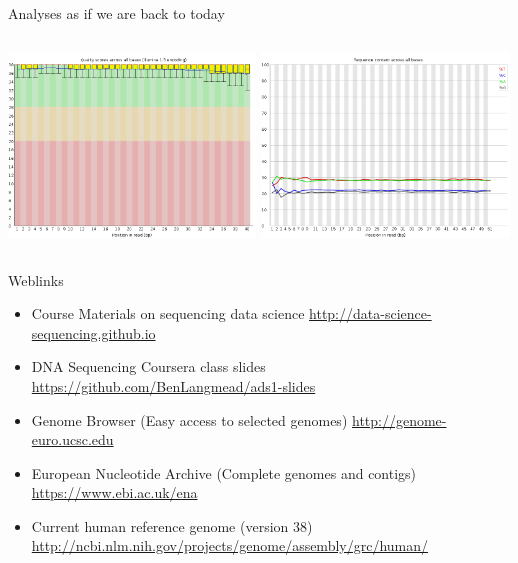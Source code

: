 \documentclass[10pt]{beamer}
\begin{document}
\begin{frame}{Analyses as if we are back to today}
	\begin{columns}[T]
		\column{\dimexpr\paperwidth-10pt}
		\includegraphics[width=0.493\textwidth]{./figures/fastqc-good.png}
		\includegraphics[width=0.493\textwidth]{./figures/fastqc-good2.png}
	\end{columns}
\end{frame}

\begin{frame}{Weblinks}
	\begin{itemize}
		\item Course Materials on sequencing data science \linebreak \url{http://data-science-sequencing.github.io}
		\item DNA Sequencing Coursera class slides \linebreak \url{https://github.com/BenLangmead/ads1-slides}
		\item Genome Browser (Easy access to selected genomes) \linebreak \url{http://genome-euro.ucsc.edu}
		\item European Nucleotide Archive (Complete genomes and contigs) \linebreak \url{https://www.ebi.ac.uk/ena}
		\item Current human reference genome (version 38) \linebreak \url{http://ncbi.nlm.nih.gov/projects/genome/assembly/grc/human/}
	\end{itemize}
\end{frame}
\end{document}
